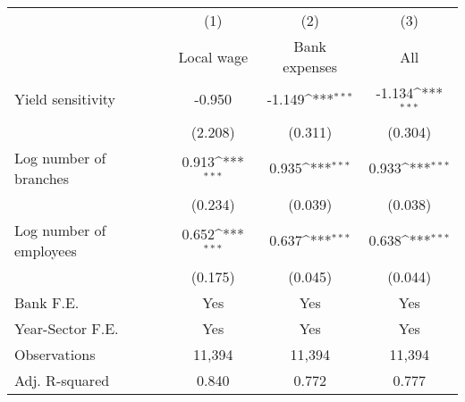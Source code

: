 {
\def\sym#1{\ifmmode^{#1}\else\(^{#1}\)\fi}
\begin{tabular*}{\hsize}{@{\hskip\tabcolsep\extracolsep\fill}l*{3}{c}}
\hline\hline
                    &\multicolumn{1}{c}{(1)}&\multicolumn{1}{c}{(2)}&\multicolumn{1}{c}{(3)}\\
                    &\multicolumn{1}{c}{Local wage}&\multicolumn{1}{c}{Bank expenses}&\multicolumn{1}{c}{All}\\
\hline
Yield sensitivity   &      -0.950         &      -1.149\sym{***}&      -1.134\sym{***}\\
                    &     (2.208)         &     (0.311)         &     (0.304)         \\
[1em]
Log number of branches&       0.913\sym{***}&       0.935\sym{***}&       0.933\sym{***}\\
                    &     (0.234)         &     (0.039)         &     (0.038)         \\
[1em]
Log number of employees&       0.652\sym{***}&       0.637\sym{***}&       0.638\sym{***}\\
                    &     (0.175)         &     (0.045)         &     (0.044)         \\
\hline
Bank F.E.           &         Yes         &         Yes         &         Yes         \\
Year-Sector F.E.    &         Yes         &         Yes         &         Yes         \\
Observations        &      11,394         &      11,394         &      11,394         \\
Adj. R-squared      &       0.840         &       0.772         &       0.777         \\
\hline\hline
\end{tabular*}
}
